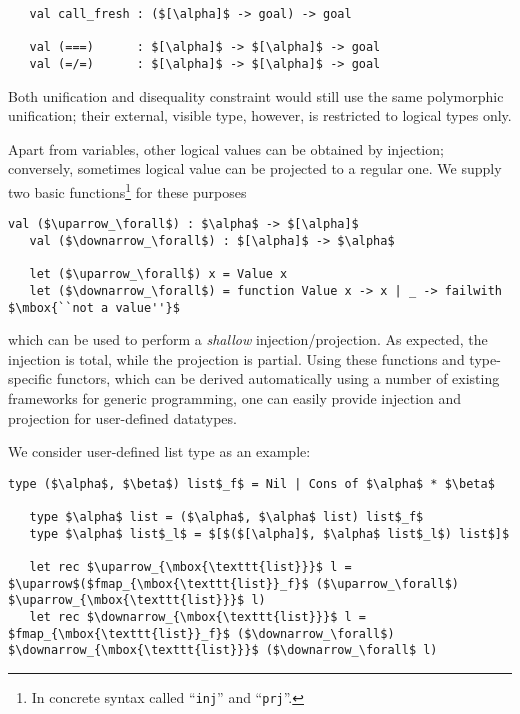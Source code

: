 \begin{lstlisting}
   val call_fresh : ($[\alpha]$ -> goal) -> goal

   val (===)      : $[\alpha]$ -> $[\alpha]$ -> goal
   val (=/=)      : $[\alpha]$ -> $[\alpha]$ -> goal
\end{lstlisting}

Both unification and disequality constraint would still use the same polymorphic unification; their external, visible type,
however, is restricted to logical types only.

Apart from variables, other logical values can be obtained by injection; conversely, sometimes logical value can be projected to 
a regular one. We supply two basic functions\footnote{In concrete syntax called ``\lstinline{inj}'' and ``\lstinline{prj}''.}
for these purposes

\begin{lstlisting}[mathescape=true]
   val ($\uparrow_\forall$) : $\alpha$ -> $[\alpha]$ 
   val ($\downarrow_\forall$) : $[\alpha]$ -> $\alpha$

   let ($\uparrow_\forall$) x = Value x
   let ($\downarrow_\forall$) = function Value x -> x | _ -> failwith $\mbox{``not a value''}$
\end{lstlisting}

which can be used to perform a \emph{shallow} injection/projection. As expected, the injection is total, while the projection is partial. 
Using these functions and type-specific functors, which can be derived automatically using a number of existing frameworks for 
generic programming, one can easily provide injection and projection for user-defined datatypes.

We consider user-defined list type as an example:

\begin{lstlisting}[mathescape=true]
   type ($\alpha$, $\beta$) list$_f$ = Nil | Cons of $\alpha$ * $\beta$
   
   type $\alpha$ list = ($\alpha$, $\alpha$ list) list$_f$
   type $\alpha$ list$_l$ = $[$($[\alpha]$, $\alpha$ list$_l$) list$]$

   let rec $\uparrow_{\mbox{\texttt{list}}}$ l = $\uparrow$($fmap_{\mbox{\texttt{list}}_f}$ ($\uparrow_\forall$) $\uparrow_{\mbox{\texttt{list}}}$ l) 
   let rec $\downarrow_{\mbox{\texttt{list}}}$ l = $fmap_{\mbox{\texttt{list}}_f}$ ($\downarrow_\forall$) $\downarrow_{\mbox{\texttt{list}}}$ ($\downarrow_\forall$ l)
\end{lstlisting}

